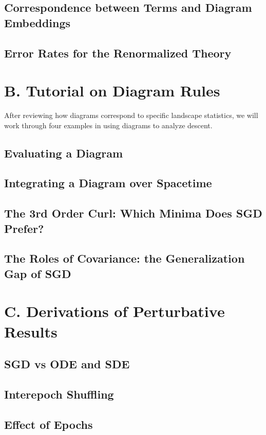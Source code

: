 \documentclass{article}
\begin{document}
    \subsection*{Correspondence between Terms and Diagram Embeddings}
    \subsection*{Error Rates for the Renormalized Theory }

\section*{B. Tutorial on Diagram Rules}
    After reviewing how diagrams correspond to specific landscape statistics,
    we will work through four examples in using diagrams to analyze descent.

    \subsection*{Evaluating a Diagram}
    \subsection*{Integrating a Diagram over Spacetime}
    \subsection*{The 3rd Order Curl: Which Minima Does SGD Prefer?}
    \subsection*{The Roles of Covariance: the Generalization Gap of SGD}
        
\section*{C. Derivations of Perturbative Results}

    \subsection*{SGD vs ODE and SDE}
    \subsection*{Interepoch Shuffling}
    \subsection*{Effect of Epochs}
\end{document}
